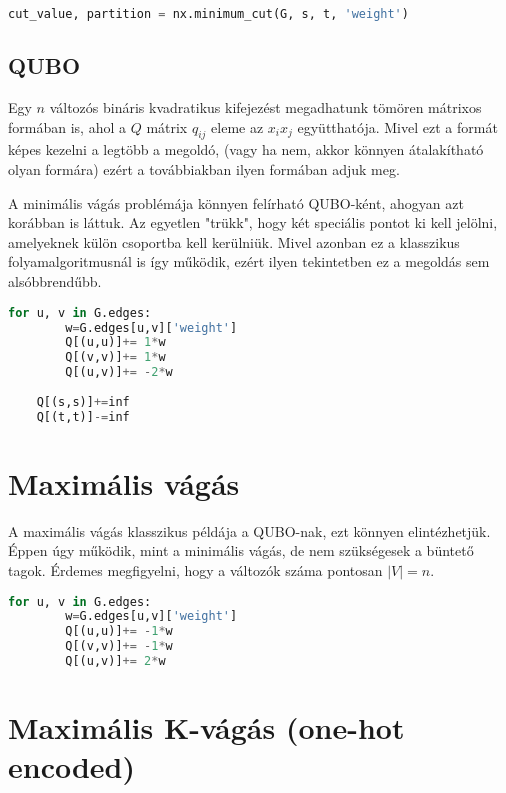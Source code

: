 \begin{lstlisting}[language=Python,caption=Min-cut flow,label=code:minCutFlow]
	cut_value, partition = nx.minimum_cut(G, s, t, 'weight')
\end{lstlisting}


\subsection{QUBO}
Egy $n$ változós bináris kvadratikus kifejezést megadhatunk tömören mátrixos formában is, ahol a $Q$ mátrix $q_{ij}$ eleme az $x_i x_j$ együtthatója. Mivel ezt a formát képes kezelni a legtöbb a megoldó, (vagy ha nem, akkor könnyen átalakítható olyan formára) ezért a továbbiakban ilyen formában adjuk meg.

A minimális vágás problémája könnyen felírható QUBO-ként, ahogyan azt korábban is láttuk. Az egyetlen "trükk", hogy két speciális pontot ki kell jelölni, amelyeknek külön csoportba kell kerülniük. Mivel azonban ez a klasszikus folyamalgoritmusnál is így működik, ezért ilyen tekintetben ez a megoldás sem alsóbbrendűbb.

\begin{lstlisting}[language=python,caption=Min-cut QUBO,label=code:minCutQUBO]
	for u, v in G.edges:
		w=G.edges[u,v]['weight']
		Q[(u,u)]+= 1*w
		Q[(v,v)]+= 1*w
		Q[(u,v)]+= -2*w
	
	Q[(s,s)]+=inf
	Q[(t,t)]-=inf
\end{lstlisting}

\section{Maximális vágás}

A maximális vágás klasszikus példája a QUBO-nak, ezt könnyen elintézhetjük. Éppen úgy működik, mint a minimális vágás, de nem szükségesek a büntető tagok. Érdemes megfigyelni, hogy a változók száma pontosan $|V|=n$.

\begin{lstlisting}[language=python,caption=Max-cut QUBO,label=code:maxCutQUBO]
	for u, v in G.edges:
		w=G.edges[u,v]['weight']
		Q[(u,u)]+= -1*w
		Q[(v,v)]+= -1*w
		Q[(u,v)]+= 2*w
\end{lstlisting}


\section{Maximális K-vágás (one-hot encoded)}

